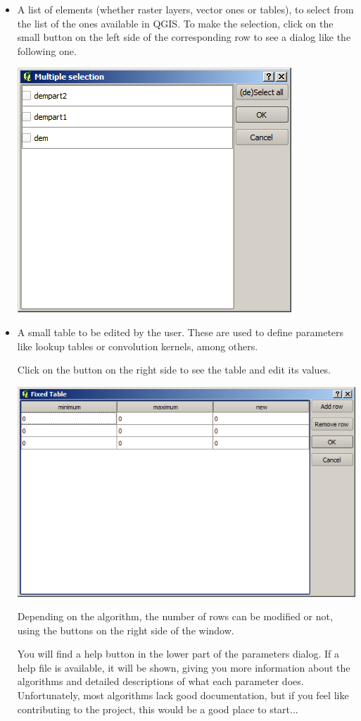 \begin{itemize}
	\item A list of elements (whether raster layers, vector ones or tables), to select from the list of the ones available in QGIS. To make the selection, click on the small button on the left side of the corresponding row to see a dialog like the following one.
		\begin{center}
		\includegraphics[width=.6\columnwidth]{multiple_selection.png}
		\end{center}		
	\item A small table to be edited by the user. These are used to define parameters like lookup tables or convolution kernels, among others.

	Click on the button on the right side to see the table and edit its values. 
\begin{center}
\includegraphics[width=.9\columnwidth]{fixed_table.png}
\end{center}

Depending on the algorithm, the number of rows can be modified or not, using the buttons on the right side of the window.

You will find a help button in the lower part of the parameters dialog. If a help file is available, it will be shown, giving you more information about the algorithms and detailed descriptions of what each parameter does. Unfortunately, most algorithms lack good documentation, but if you feel like contributing to the project, this would be a good place to start...

\end{itemize}

